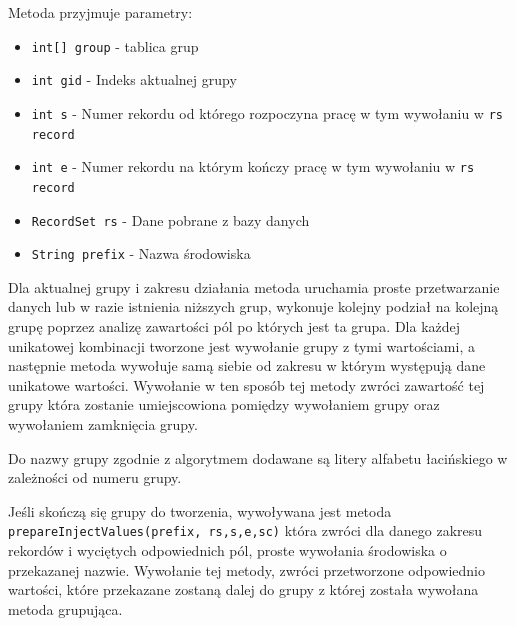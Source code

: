 Metoda przyjmuje parametry:
\begin{itemize}
\item \texttt{int[] group} - tablica grup
\item \texttt{int gid} - Indeks aktualnej grupy
\item\texttt{int s} - Numer rekordu od którego rozpoczyna pracę w tym wywołaniu w \texttt{rs record}
\item \texttt{int e} - Numer rekordu na którym kończy pracę w tym wywołaniu w \texttt{rs record}
\item \texttt{RecordSet rs} - Dane pobrane z bazy danych
\item \texttt{String prefix} - Nazwa środowiska
\end{itemize}
\vspace{5mm}
Dla aktualnej grupy i zakresu działania metoda uruchamia proste przetwarzanie danych lub w razie istnienia niższych grup, wykonuje kolejny podział na kolejną grupę poprzez analizę zawartości pól po których jest ta grupa. Dla każdej unikatowej kombinacji tworzone jest wywołanie grupy z tymi wartościami, a następnie metoda wywołuje samą siebie od zakresu w którym występują dane unikatowe wartości. Wywołanie w ten sposób tej metody zwróci zawartość tej grupy która zostanie umiejscowiona pomiędzy wywołaniem grupy oraz wywołaniem zamknięcia grupy.
\par 
Do nazwy grupy zgodnie z algorytmem dodawane są litery alfabetu łacińskiego w zależności od numeru grupy.
\par
Jeśli skończą się grupy do tworzenia, wywoływana jest metoda \texttt{prepareInjectValues(prefix, rs,s,e,sc)} która zwróci dla danego zakresu rekordów i wyciętych odpowiednich pól, proste wywołania środowiska o przekazanej nazwie. Wywołanie tej metody, zwróci przetworzone odpowiednio wartości, które przekazane zostaną dalej do grupy z której została wywołana metoda grupująca.


